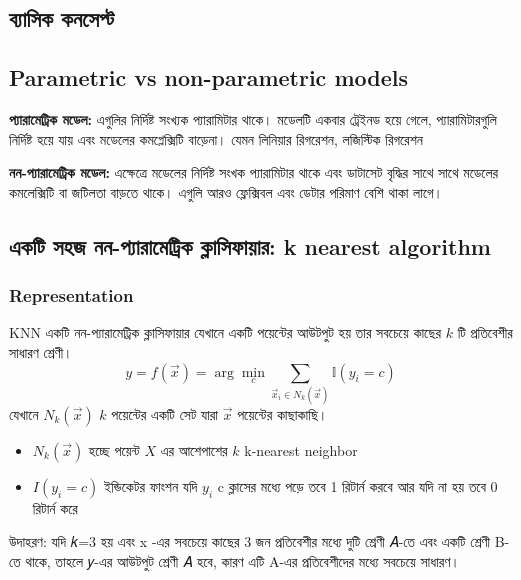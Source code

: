 \documentclass[graybox, envcountchap, twocolumn]{styles/svmult}
\begin{document}
\begin{enumerate}
\section{{\bengalifont ব্যাসিক কনসেপ্ট}}


\subsection{Parametric vs non-parametric models}
\bengalifont
\textbf{{\bengalifont প্যারামেট্রিক মডেল:}} এগুলির নির্দিষ্ট সংখ্যক প্যারামিটার থাকে।  মডেলটি একবার ট্রেইনড হয়ে গেলে, প্যারামিটারগুলি নির্দিষ্ট হয়ে যায় এবং মডেলের কমপ্লেক্সিটি বাড়েনা। যেমন লিনিয়ার রিগরেশন, লজিস্টিক রিগরেশন

\textbf{{\bengalifont নন-প্যারামেট্রিক মডেল:}} এক্ষেত্রে মডেলের নির্দিষ্ট সংখক প্যারামিটার থাকে এবং ডাটাসেট বৃদ্ধির সাথে সাথে মডেলের কমলেক্সিটি বা জটিলতা বাড়তে থাকে।  এগুলি আরও ফ্লেক্সিবল এবং ডেটার পরিমাণ বেশি থাকা লাগে। 

\subsection{{\bengalifont একটি সহজ নন-প্যারামেট্রিক ক্লাসিফায়ার:} k nearest algorithm }

\subsubsection{Representation}
\bengalifont
KNN একটি নন-প্যারামেট্রিক ক্লাসিফায়ার যেখানে একটি পয়েন্টের আউটপুট হয় তার সবচেয়ে কাছের $𝑘$ টি প্রতিবেশীর সাধারণ শ্রেণী।
\begin{equation}
y=f(\vec{x})=\arg\min_{c}{\sum\limits_{\vec{x}_i \in N_k(\vec{x})} \mathbb{I}(y_i=c)}
\end{equation}
\bengalifont
যেখানে $N_k(\vec{x})$  $k$ পয়েন্টের একটি সেট যারা  $\vec{x}$ পয়েন্টের কাছাকাছি। 
\begin{itemize}
    \item $N_k(\vec{x})$ {\bengalifont হচ্ছে পয়েন্ট $X$ এর আশেপাশের $𝑘$ k-nearest neighbor}
    \item ${I}(y_i=c)$ {\bengalifont ইন্ডিকেটর ফাংশন যদি $y_i$ c ক্লাসের মধ্যে পড়ে তবে 1 রিটার্ন করবে আর যদি না হয় তবে 0 রিটার্ন করে} 
\end{itemize}


উদাহরণ: যদি 𝑘=3 হয় এবং x -এর সবচেয়ে কাছের 3 জন প্রতিবেশীর মধ্যে দুটি শ্রেণী 𝐴-তে এবং একটি শ্রেণী B-তে থাকে, তাহলে 𝑦-এর আউটপুট শ্রেণী 𝐴 হবে, কারণ এটি A-এর প্রতিবেশীদের মধ্যে সবচেয়ে সাধারণ।


\end{enumerate}
\end{document}
